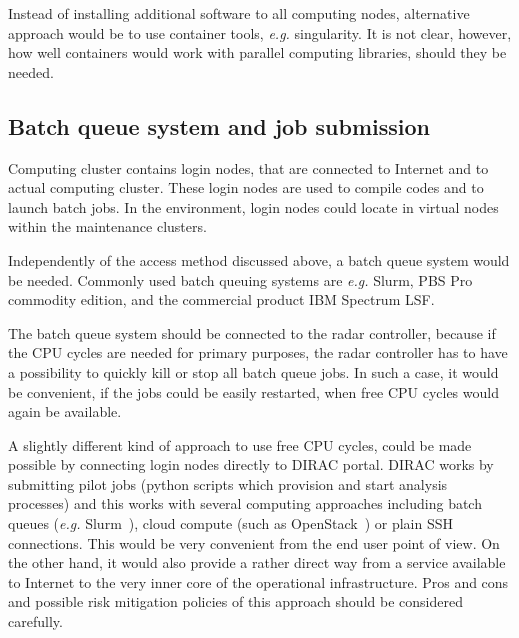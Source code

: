 \documentclass[12pt,a4paper]{article}
\begin{document}
Instead of installing additional software to all computing nodes,  alternative approach would be to use container tools, \emph{e.g.} singularity. 
It is not clear, however, how well containers would work with parallel computing libraries, should they be needed.

\subsection{Batch queue system and job submission}

Computing cluster contains login nodes, that are connected to Internet and to actual computing cluster. These login nodes are used to compile codes and to launch batch jobs. In the \ED environment, login nodes could locate in virtual nodes within the maintenance clusters. 

Independently of the access method discussed above, a batch queue system would be needed. Commonly used batch queuing systems are \emph{e.g.} Slurm, PBS Pro commodity edition, and the commercial product IBM Spectrum LSF. 

The batch queue system should be connected to the \ED radar controller, because if the CPU cycles are needed for primary purposes, 
the radar controller has to have a possibility to quickly kill or stop all batch queue jobs. In such a case, it would be convenient, if the jobs could be easily restarted, when free CPU cycles would again be available.

A slightly different kind of approach to use free CPU cycles, could be made possible by connecting login nodes directly to DIRAC portal. 
DIRAC works by submitting pilot jobs (python scripts which provision and start analysis processes) and this works with several computing approaches including batch queues (\emph{e.g.} Slurm~\cite{slurm}), cloud compute (such as OpenStack~\cite{openstack}) or plain SSH connections. 
This would be very convenient from the end user point of view. 
On the other hand, it would also provide a rather direct way from a service available to Internet to the very inner core of the operational \ED infrastructure. 
Pros and cons and possible risk mitigation policies of this approach should be considered  carefully.

\newpage
{}

\end{document}
